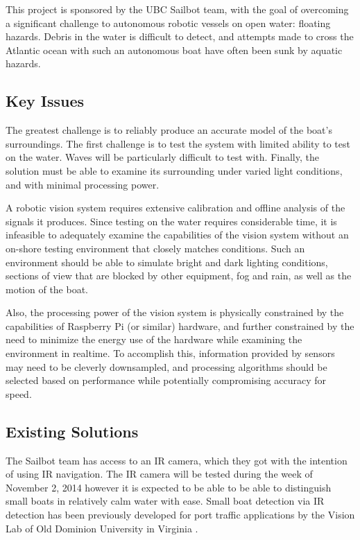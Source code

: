 This project is sponsored by the UBC Sailbot team, with the goal of overcoming a significant challenge to autonomous robotic vessels on open water: floating hazards. Debris in the water is difficult to detect, and attempts made to cross the Atlantic ocean with such an autonomous boat have often been sunk by aquatic hazards.


\subsection{\label{sec:intro:key-issues}Key Issues}
The greatest challenge is to reliably produce an accurate model of the boat's surroundings. The first challenge is to test the system with limited ability to test on the water.  Waves will be particularly difficult to test with.  Finally, the solution must be able to examine its surrounding under varied light conditions, and with minimal processing power.

A robotic vision system requires extensive calibration and offline analysis of the signals it produces. Since testing on the water requires considerable time, it is infeasible to adequately examine the capabilities of the vision system without an on-shore testing environment that closely matches conditions. Such an environment should be able to simulate bright and dark lighting conditions, sections of view that are blocked by other equipment, fog and rain, as well as the motion of the boat.

Also, the processing power of the vision system is physically constrained by the capabilities of Raspberry Pi (or similar) hardware, and further constrained by the need to minimize the energy use of the hardware while examining the environment in realtime. To accomplish this, information provided by sensors may need to be cleverly downsampled, and processing algorithms should be selected based on performance while potentially compromising accuracy for speed.


\subsection{\label{sec:intro:existing-solutions}Existing Solutions}
The Sailbot team has access to an IR camera, which they got with the intention of using IR navigation. The IR camera will be tested during the week of November 2, 2014 however it is expected to be able to be able to distinguish small boats in relatively calm water with ease. Small boat detection via IR detection has been previously developed for port traffic applications by the Vision Lab of Old Dominion University in Virginia \cite{ODU-boat-IR-detection}.

